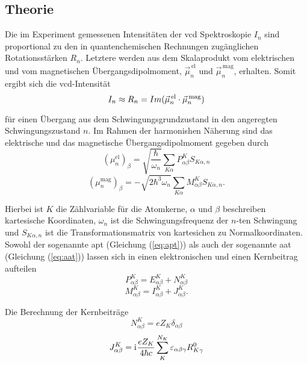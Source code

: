 	\subsection{Theorie}
	Die im Experiment gemessenen Intensitäten der \ac{vcd} Spektroskopie $I_n$ sind proportional zu den in quantenchemischen Rechnungen zugänglichen Rotationsstärken $R_n$. Letztere werden aus dem Skalaprodukt vom elektrischen und vom magnetischen Übergangsdipolmoment, $\vec{\mu}_n^{\,\text{el}}$ und $\vec{\mu}_n^{\,\text{mag}}$,  erhalten. Somit ergibt sich die \ac{vcd}-Intensität
	\begin{equation}\label{eq:rotationsstaerke}
	  I_n\approx R_n = Im(\vec{\mu}_n^{\,\text{el}}\cdot\vec{\mu}_n^{\text{\,mag}})
	\end{equation}
	
	für einen Übergang aus dem Schwingungsgrundzustand in den angeregten Schwingungszustand $n$.\supercite{stephens1985theory,stephens1985vibrational} Im Rahmen der harmonishen Näherung sind das elektrische und das magnetische Übergangsdipolmoment gegeben durch\supercite{cheeseman1996ab,nicu2008vibrational}	
	\begin{equation}\label{eq:eludm}
	  (\mu_n^{\text{el}})_\beta=\sqrt{\frac{\hbar}{\omega_n}}\sum_{K\alpha}P_{\alpha\beta}^K S_{K\alpha,n}
	\end{equation}
	\begin{equation}\label{eq:magudm}
	  (\mu_n^{\text{mag}})_\beta=-\sqrt{2\hbar^3\omega_n}\sum_{K\alpha}M_{\alpha\beta}^KS_{K\alpha,n}.
	\end{equation}
	
	Hierbei ist $K$ die Zählvariable für die Atomkerne, $\alpha$ und $\beta$ beschreiben kartesische Koordinaten, $\omega_n$ ist die Schwingungsfrequenz der $n$-ten Schwingung und $S_{K\alpha,n}$ ist die Transformationsmatrix von kartesichen zu Normalkoordinaten. Sowohl der sogenannte \ac{apt} (Gleichung (\ref{eq:apt})) als auch der sogenannte \ac{aat} (Gleichung (\ref{eq:aat})) lassen sich in einen elektronischen und einen Kernbeitrag aufteilen
	\begin{equation}\label{eq:apt}
	  P^K_{\alpha\beta}=E^K_{\alpha\beta}+N^K_{\alpha\beta}
	\end{equation}
	\begin{equation}\label{eq:aat}
   	  M^K_{\alpha\beta}=I^K_{\alpha\beta}+J^K_{\alpha\beta}.
	\end{equation}
	
	Die Berechnung der Kernbeiträge 
	\begin{equation}
	  N^K_{\alpha\beta}=eZ_K\delta_{\alpha\beta}
	\end{equation}
	\begin{equation}\label{eq:aatkern}
	  J^K_{\alpha\beta}=\mathrm{i}\mkern1mu\frac{eZ_K}{4\hbar c}\sum_K^{N_K}\varepsilon_{\alpha\beta\gamma}R^0_{K\gamma}
	\end{equation}
	
